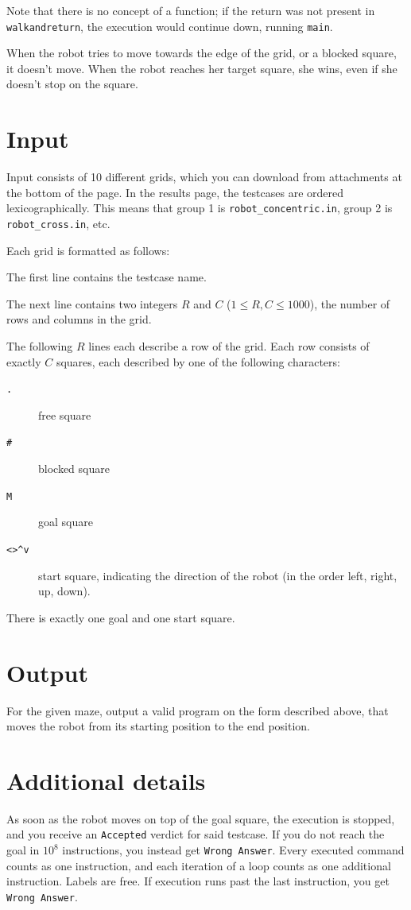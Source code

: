 Note that there is no concept of a function; if the return was not present in \texttt{walkandreturn}, the execution would continue down, running \texttt{main}.

When the robot tries to move towards the edge of the grid, or a blocked square, it doesn't move. When the robot reaches her target square, she wins, even if she doesn't stop on the square.

\section*{Input}
Input consists of 10 different grids, which you can download from attachments at the bottom of the page. In the results page,
the testcases are ordered lexicographically. This means that group 1 is \texttt{robot\_concentric.in}, group 2 is \texttt{robot\_cross.in}, etc.

Each grid is formatted as follows:

The first line contains the testcase name.

The next line contains two integers $R$ and $C$ ($1 \le R,C \le 1000$), the number of rows and columns in the grid.

The following $R$ lines each describe a row of the grid.
Each row consists of exactly $C$ squares, each described by one of the following characters:
\begin{description}
  \item[\texttt{.}] free square
  \item[\texttt{\#}] blocked square
  \item[\texttt{M}] goal square
  \item[\texttt{<>\textasciicircum{}v}] start square, indicating the direction of the robot (in the order left, right, up, down).
\end{description}

There is exactly one goal and one start square.

\section*{Output}
For the given maze, output a valid program on the form described above, that moves the robot from its starting position to the end position.

\section*{Additional details}
As soon as the robot moves on top of the goal square, the execution is stopped, and you receive an \texttt{Accepted} verdict for said testcase.
If you do not reach the goal in $10^8$ instructions, you instead get \texttt{Wrong Answer}.
Every executed command counts as one instruction, and each iteration of a loop counts as one additional instruction.
Labels are free.
If execution runs past the last instruction, you get \texttt{Wrong Answer}.

